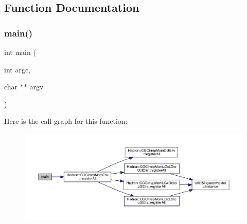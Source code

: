 \subsection{Function Documentation}
\mbox{\label{adat-devel_2main_2dbutil_2dbconvert__write_8cc_a3c04138a5bfe5d72780bb7e82a18e627}} 
\subsubsection{\texorpdfstring{main()}{main()}}
{\footnotesize\ttfamily int main (\begin{DoxyParamCaption}\item[{int}]{argc,  }\item[{char $\ast$$\ast$}]{argv }\end{DoxyParamCaption})}

Here is the call graph for this function\+:
\nopagebreak
\begin{figure}[H]
\begin{center}
\leavevmode
\includegraphics[width=350pt]{da/db3/adat-devel_2main_2dbutil_2dbconvert__write_8cc_a3c04138a5bfe5d72780bb7e82a18e627_cgraph}
\end{center}
\end{figure}
